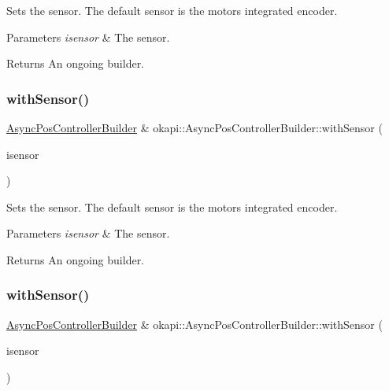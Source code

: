 Sets the sensor. The default sensor is the motor\textquotesingle{}s integrated encoder.


\begin{DoxyParams}{Parameters}
{\em isensor} & The sensor. \\
\hline
\end{DoxyParams}
\begin{DoxyReturn}{Returns}
An ongoing builder. 
\end{DoxyReturn}
\mbox{\label{classokapi_1_1AsyncPosControllerBuilder_ad6667ad29a7834452b50390294cde4fa}} 
\subsubsection{\texorpdfstring{withSensor()}{withSensor()}\hspace{0.1cm}{\footnotesize\ttfamily [2/3]}}
{\footnotesize\ttfamily \mbox{\hyperlink{classokapi_1_1AsyncPosControllerBuilder}{Async\+Pos\+Controller\+Builder}} \& okapi\+::\+Async\+Pos\+Controller\+Builder\+::with\+Sensor (\begin{DoxyParamCaption}\item[{const \mbox{\hyperlink{classokapi_1_1IntegratedEncoder}{Integrated\+Encoder}} \&}]{isensor }\end{DoxyParamCaption})}

Sets the sensor. The default sensor is the motor\textquotesingle{}s integrated encoder.


\begin{DoxyParams}{Parameters}
{\em isensor} & The sensor. \\
\hline
\end{DoxyParams}
\begin{DoxyReturn}{Returns}
An ongoing builder. 
\end{DoxyReturn}
\mbox{\label{classokapi_1_1AsyncPosControllerBuilder_a1e6bf12a95ebde3adc90f3d6cfaf9adc}} 
\subsubsection{\texorpdfstring{withSensor()}{withSensor()}\hspace{0.1cm}{\footnotesize\ttfamily [3/3]}}
{\footnotesize\ttfamily \mbox{\hyperlink{classokapi_1_1AsyncPosControllerBuilder}{Async\+Pos\+Controller\+Builder}} \& okapi\+::\+Async\+Pos\+Controller\+Builder\+::with\+Sensor (\begin{DoxyParamCaption}\item[{const std\+::shared\+\_\+ptr$<$ \mbox{\hyperlink{classokapi_1_1RotarySensor}{Rotary\+Sensor}} $>$ \&}]{isensor }\end{DoxyParamCaption})}

